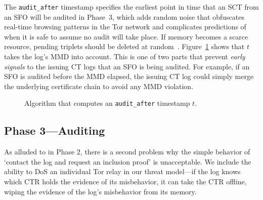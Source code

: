 The \texttt{audit\_after} timestamp specifies the earliest point in time that an
SCT from an SFO will be audited in Phase~3, which adds random noise that
obfuscates real-time browsing patterns in the Tor network and complicates
predictions of when it is safe to assume no audit will take place.  If memory
becomes a scarce resource, pending triplets should be deleted at
random~\cite{nordberg}. Figure~\ref{fig:audit-after} shows that $t$ takes the
log's MMD into account.  This is one of two parts that prevent \emph{early
signals} to the issuing CT logs that an SFO is being audited.  For example, if
an SFO is audited before the MMD elapsed, the issuing CT log could simply merge
the underlying certificate chain to avoid any MMD violation.


\begin{figure}
	\centering
	\caption{%
		Algorithm that computes an \texttt{audit\_after} timestamp $t$.
	}
	\label{fig:audit-after}
\end{figure}

\subsection{Phase 3---Auditing} \label{sec:base:phase3}

As alluded to in Phase 2, there is a second problem why the simple behavior of
`contact the log and request an inclusion proof' is unacceptable. We include the
ability to DoS an individual Tor relay in our threat model---if the log knows
which CTR holds the evidence of its misbehavior, it can take the CTR offline,
wiping the evidence of the log's misbehavior from its memory. 

